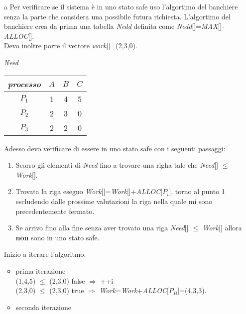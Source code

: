 \documentclass{article}
\begin{document}
   \begin{itemize}
      \item[a] Per verificare se il sistema è in uno stato safe uso l'algortimo del banchiere senza la parte che considera una possibile futura richiesta.
         L'algortimo del banchiere crea da prima una tabella \emph{Nedd} definita come \emph{Nedd}[]=\emph{MAX}[]-\emph{ALLOC}[].\\
         Devo inoltre porre il vettore \emph{work}[]=(2,3,0).
         \begin{center}
            \emph{Need}\\
            \begin{tabular}{|c|c|c|c|}
               \hline
               \emph{processo} & $A$ & $B$ & $C$\\
               \hline
               $P_1$ & 1 & 4 & 5\\
               \hline
               $P_2$ & 2 & 3 & 0\\
               \hline
               $P_3$ & 2 & 2 & 0\\
               \hline
            \end{tabular}
         \end{center}
         Adesso devo verificare di essere in uno stato safe con i seguenti passaggi:
         \begin{enumerate}
            \item Scorro gli elementi di \emph{Need} fino a trovare una righa tale che \emph{Need}[] $\le$ \emph{Work}[].
            \item Trovata la riga eseguo \emph{Work}[]=\emph{Work}[]+\emph{ALLOC}[$P_i$], torno al punto 1 escludendo dalle prossime valutazioni la riga nella quale mi sono  precedentemente fermato.
            \item Se arrivo fino alla fine senza aver trovato una riga \emph{Need}[] $\le$ \emph{Work}[] allora \textbf{non} sono in uno stato safe.
         \end{enumerate}
         Inizio a iterare l'algoritmo.
         \begin{itemize}
            \item prima iterazione\\
               (1,4,5) $\le$ (2,3,0) false $\Rightarrow$ ++i\\
               (2,3,0) $\le$ (2,3,0) true $\Rightarrow$ \emph{Work}=\emph{Work}+\emph{ALLOC}[$P_B$]=(4,3,3).
            \item seconda iterazione\\

\end{itemize}
\end{itemize}
\end{document}
